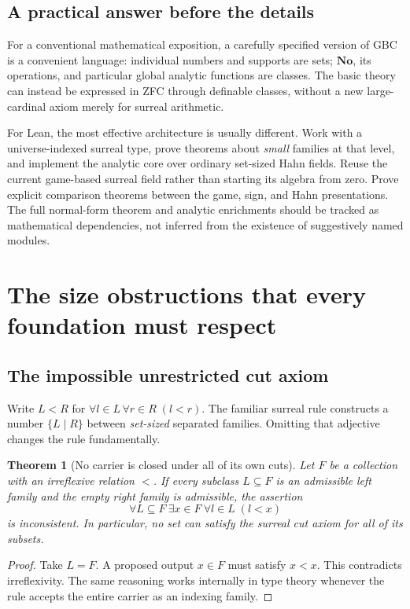 \documentclass[11pt,letterpaper]{article}
\numberwithin{equation}{section}
\newtheorem{theorem}{Theorem}[section]
\theoremstyle{definition}
\theoremstyle{remark}
\newcommand{\No}{\mathbf{No}}
\begin{document}
\subsection{A practical answer before the details}
For a conventional mathematical exposition, a carefully specified version of GBC is a convenient language: individual numbers and supports are sets; $\No$, its operations, and particular global analytic functions are classes. The basic theory can instead be expressed in ZFC through definable classes, without a new large-cardinal axiom merely for surreal arithmetic.

For Lean, the most effective architecture is usually different. Work with a universe-indexed surreal type, prove theorems about \emph{small} families at that level, and implement the analytic core over ordinary set-sized Hahn fields. Reuse the current game-based surreal field rather than starting its algebra from zero. Prove explicit comparison theorems between the game, sign, and Hahn presentations. The full normal-form theorem and analytic enrichments should be tracked as mathematical dependencies, not inferred from the existence of suggestively named modules.

\section{The size obstructions that every foundation must respect}\label{sec:obstructions}
\subsection{The impossible unrestricted cut axiom}
Write $L<R$ for $\forall l\in L\,\forall r\in R\;(l<r)$. The familiar surreal rule constructs a number $\{L\mid R\}$ between \emph{set-sized} separated families. Omitting that adjective changes the rule fundamentally.

\begin{theorem}[No carrier is closed under all of its own cuts]\label{thm:nocut}
Let $F$ be a collection with an irreflexive relation $<$. If every subclass $L\subseteq F$ is an admissible left family and the empty right family is admissible, the assertion
\[
 \forall L\subseteq F\ \exists x\in F\ \forall l\in L\;(l<x)
\]
is inconsistent. In particular, no set can satisfy the surreal cut axiom for all of its subsets.
\end{theorem}
\begin{proof}
Take $L=F$. A proposed output $x\in F$ must satisfy $x<x$. This contradicts irreflexivity. The same reasoning works internally in type theory whenever the rule accepts the entire carrier as an indexing family.
\end{proof}
\end{document}
